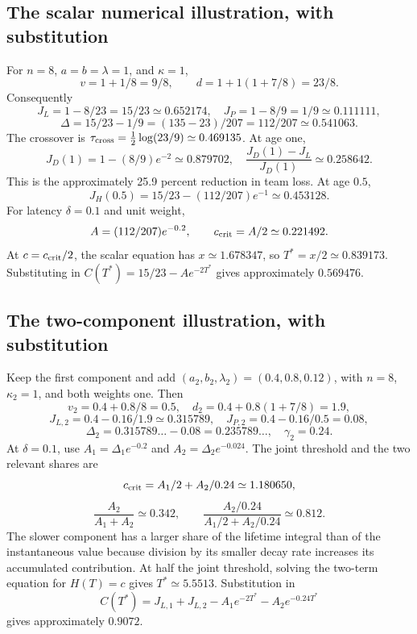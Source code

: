 \documentclass[12pt,letterpaper]{article}
\begin{document}
\subsection{The scalar numerical illustration, with substitution}
For $n=8$, $a=b=\lambda=1$, and $\kappa=1$,
\[
v=1+1/8=9/8,\qquad d=1+1(1+7/8)=23/8.
\]
Consequently
\[
J_L=1-8/23=15/23\simeq0.652174,
\quad J_P=1-8/9=1/9\simeq0.111111,
\]
\[
\Delta=15/23-1/9=(135-23)/207=112/207\simeq0.541063.
\]
The crossover is $\tau_{\rm cross}=\tfrac12\log(23/9)\simeq0.469135$. At age one,
\[
J_D(1)=1-(8/9)e^{-2}\simeq0.879702,
\quad \frac{J_D(1)-J_L}{J_D(1)}\simeq0.258642.
\]
This is the approximately 25.9 percent reduction in team loss. At age $0.5$,
\[
J_H(0.5)=15/23-(112/207)e^{-1}\simeq0.453128.
\]
For latency $\delta=0.1$ and unit weight,
\[
A=(112/207)e^{-0.2},\qquad c_{\rm crit}=A/2\simeq0.221492.
\]
At $c=c_{\rm crit}/2$, the scalar equation has $x\simeq1.678347$, so $T^*=x/2\simeq0.839173$. Substituting in $C(T^*)=15/23-Ae^{-2T^*}$ gives approximately $0.569476$.

\subsection{The two-component illustration, with substitution}
Keep the first component and add $(a_2,b_2,\lambda_2)=(0.4,0.8,0.12)$, with $n=8$, $\kappa_2=1$, and both weights one. Then
\[
v_2=0.4+0.8/8=0.5,\quad d_2=0.4+0.8(1+7/8)=1.9,
\]
\[
J_{L,2}=0.4-0.16/1.9\simeq0.315789,
\quad J_{P,2}=0.4-0.16/0.5=0.08,
\]
\[
\Delta_2=0.315789\ldots-0.08=0.235789\ldots,\quad \gamma_2=0.24.
\]
At $\delta=0.1$, use $A_1=\Delta_1e^{-0.2}$ and $A_2=\Delta_2e^{-0.024}$. The joint threshold and the two relevant shares are
\[
c_{\rm crit}=A_1/2+A_2/0.24\simeq1.180650,
\]
\[
\frac{A_2}{A_1+A_2}\simeq0.342,
\qquad \frac{A_2/0.24}{A_1/2+A_2/0.24}\simeq0.812.
\]
The slower component has a larger share of the lifetime integral than of the instantaneous value because division by its smaller decay rate increases its accumulated contribution. At half the joint threshold, solving the two-term equation for $H(T)=c$ gives $T^*\simeq5.5513$. Substitution in
\[
C(T^*)=J_{L,1}+J_{L,2}-A_1e^{-2T^*}-A_2e^{-0.24T^*}
\]
gives approximately $0.9072$.
\end{document}
